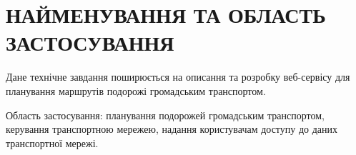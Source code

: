 \chapter{НАЙМЕНУВАННЯ ТА ОБЛАСТЬ ЗАСТОСУВАННЯ}

Дане технічне завдання поширюється на описання та розробку веб-сервісу для планування маршрутів подорожі громадським
транспортом.

Область застосування: планування подорожей громадським транспортом, керування транспортною мережею, надання користувачам доступу до даних транспортної мережі.

\bigskip
\bigskip
\bigskip
\bigskip